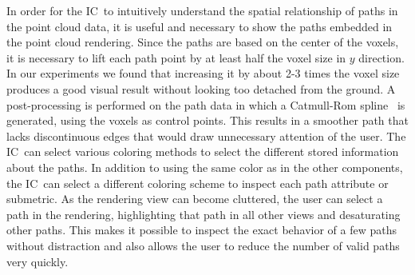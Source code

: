 \documentclass[conference,10pt,letter]{IEEEtran}
\def\IC{IC}
\begin{document}
%
%
 In order for the \IC\ to intuitively understand the spatial relationship of paths in the point cloud data, it is useful and necessary to show the paths embedded in the point cloud rendering. Since the paths are based on the center of the voxels, it is necessary to lift each path point by at least half the voxel size in $y$ direction. In our experiments we found that increasing it by about 2-3 times the voxel size produces a good visual result without looking too detached from the ground. A post-processing is performed on the path data in which a Catmull-Rom spline~\cite{catmull1974class} is generated, using the voxels as control points. This results in a smoother path that lacks discontinuous edges that would draw unnecessary attention of the user. The \IC\ can select various coloring methods to select the different stored information about the paths. In addition to using the same color as in the other components, the \IC\ can select a different coloring scheme to inspect each path attribute or submetric. As the rendering view can become cluttered, the user can select a path in the rendering, highlighting that path in all other views and desaturating other paths. This makes it possible to inspect the exact behavior of a few paths without distraction and also allows the user to reduce the number of valid paths very quickly.
%
\end{document}
